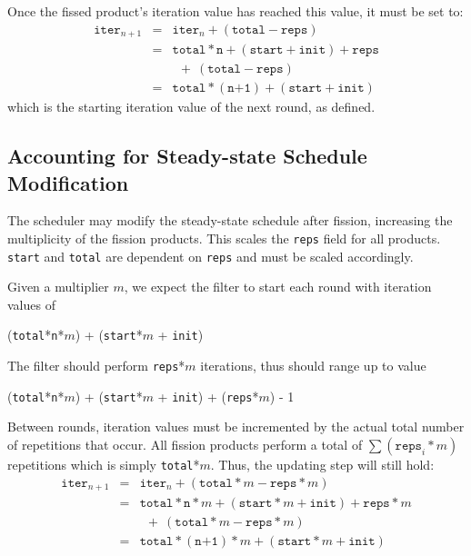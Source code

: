 Once the fissed product's iteration value has reached
this value, it must be set to:
\begin{eqnarray*}
\texttt{iter}_{n+1} &=& \texttt{iter}_{n} + (\texttt{total} - \texttt{reps}) \\
&=& \texttt{total}*\texttt{n} + (\texttt{start} + \texttt{init}) + \texttt{reps} \\
&&  \ \ +\ (\texttt{total} - \texttt{reps}) \\
&=& \texttt{total}*(\texttt{n+1}) + (\texttt{start} + \texttt{init})
\end{eqnarray*}
which is the starting iteration value of the next round, as defined.

\subsection{Accounting for Steady-state Schedule Modification}

The scheduler may modify the steady-state schedule after fission, increasing the multiplicity of the fission products.  This scales the \texttt{reps} field for all products.  \texttt{start} and \texttt{total} are dependent on \texttt{reps} and must be scaled accordingly.

Given a multiplier $m$, we expect the filter to start each round with iteration values of 
\begin{center}
(\texttt{total}*\texttt{n}*$m$) + (\texttt{start}*$m$ + \texttt{init})
\end{center}
The filter should perform \texttt{reps}*$m$ iterations, thus should range up to value
\begin{center}
(\texttt{total}*\texttt{n}*$m$) + (\texttt{start}*$m$ + \texttt{init}) + (\texttt{reps}*$m$) - 1
\end{center}

Between rounds, iteration values must be incremented by the actual total number of repetitions that occur.  All fission products perform a total of $\sum(\texttt{reps}_{i}*m)$ repetitions which is simply \texttt{total}*$m$.  Thus, the updating step will still hold:
\begin{eqnarray*}
\texttt{iter}_{n+1} &=& \texttt{iter}_{n} + (\texttt{total}*m - \texttt{reps}*m) \\
&=& \texttt{total}*\texttt{n}*m + (\texttt{start}*m + \texttt{init}) + \texttt{reps}*m \\
&&  \ \ +\ (\texttt{total}*m - \texttt{reps}*m) \\
&=& \texttt{total}*(\texttt{n+1})*m + (\texttt{start}*m + \texttt{init})
\end{eqnarray*}
